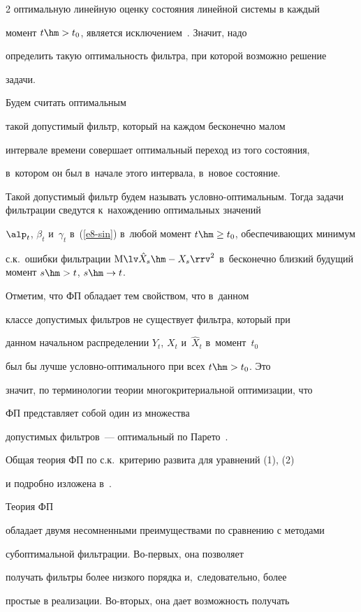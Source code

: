 \begin{multicols}{2}
оптимальную линейную оценку состояния линейной системы в каждый

момент $t\hm>t_0$, является исключением~\cite{1-sin}. Значит, надо

определить такую оптимальность фильтра, при которой возможно решение

задачи.

Будем считать оптимальным

такой допустимый фильтр, который на каждом бесконечно малом

интервале времени совершает оптимальный переход из того со\-сто\-яния,

в~котором он был в~начале этого интервала, в~новое со\-сто\-яние.

Такой допустимый фильтр будем называть   услов\-но-оп\-ти\-маль\-ным. Тогда задачи фильтрации сведутся к~нахождению оптимальных значений

 $\alp_t$, $\beta_t$ и~$\gamma_t$ в~(\ref{e8-sin}) в~любой момент  $t\hm\ge t_0$, обеспечивающих минимум

с.к.\ ошибки фильтрации $\mathrm{M}\lv \hat X_s \hm-

X_s\rrv^2$  в~бесконечно близкий будущий момент  $s\hm> t$, $s\hm\to t$.



Отметим, что ФП обладает тем свойством, что в~данном

классе допустимых фильтров не существует фильтра, который при

данном начальном распределении  $Y_t$, $X_t$ и~$\hat{X}_t$ в~момент~$t_0$

был бы лучше услов\-но-оп\-ти\-маль\-но\-го при всех  $t\hm>t_0$. Это

значит, по терминологии теории многокритериальной оптимизации, что

ФП представляет собой один из множества

допустимых фильтров~---  оптимальный по Парето~\cite{1-sin}.

Общая теория ФП по с.к.\ критерию развита для уравнений (1), (2)

и подробно изложена в~\cite{1-sin}.

Теория ФП

обладает двумя несомненными преимуществами по сравнению с методами

субоптимальной фильтрации. Во-пер\-вых, она позволяет

получать фильтры более низкого порядка и,~следовательно, более

простые в реализации. Во-вто\-рых, она дает возможность получать


\end{multicols}
